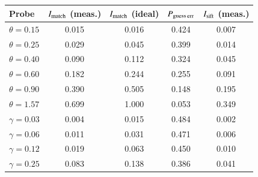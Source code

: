 \begin{tabular}{lcccc}
\toprule
Probe & $I_{\rm match}$ (meas.) & $I_{\rm match}$ (ideal) & $P_{\rm guess\,err}$ & $I_{\rm sift}$ (meas.) \\
\midrule
$\theta=0.15$ & 0.015 & 0.016 & 0.424 & 0.007 \\
$\theta=0.25$ & 0.029 & 0.045 & 0.399 & 0.014 \\
$\theta=0.40$ & 0.090 & 0.112 & 0.324 & 0.045 \\
$\theta=0.60$ & 0.182 & 0.244 & 0.255 & 0.091 \\
$\theta=0.90$ & 0.390 & 0.505 & 0.148 & 0.195 \\
$\theta=1.57$ & 0.699 & 1.000 & 0.053 & 0.349 \\
\midrule
$\gamma=0.03$ & 0.004 & 0.015 & 0.484 & 0.002 \\
$\gamma=0.06$ & 0.011 & 0.031 & 0.471 & 0.006 \\
$\gamma=0.12$ & 0.019 & 0.063 & 0.450 & 0.010 \\
$\gamma=0.25$ & 0.083 & 0.138 & 0.386 & 0.041 \\
\bottomrule
\end{tabular}
